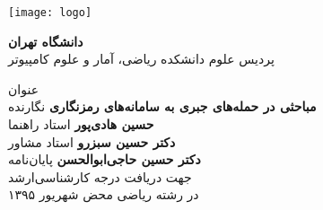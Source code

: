 \begin{center}
\thispagestyle{empty}
\vspace*{-15mm}
\texttt{[image: logo]} \\
\begin{Large}
\textbf{دانشگاه تهران} \\
پردیس علوم
\vskip 0.1cm
دانشکده ریاضی، آمار و علوم کامپیوتر
\end{Large}
\vskip 1cm
\large{عنوان} \\
\huge{\textbf{مباحثی در حمله‌های جبری به سامانه‌های رمزنگاری}}
\vskip 1.5cm
\large{نگارنده}  \\
\large{\textbf{حسین هادی‌پور}}
\vskip 0.7cm
\large{استاد راهنما} \\
\large{\textbf{دکتر حسین سبزرو}}
\vskip 0.7cm
\large{استاد مشاور}\\
\large{\textbf{دکتر حسین حاجی‌ابوالحسن}}
\vskip 1cm
پایان‌نامه 
\\
جهت دریافت درجه کارشناسی‌ارشد
\\
در رشته ریاضی محض
\vskip 0.5cm
\large{شهریور ۱۳۹۵}
\end{center}